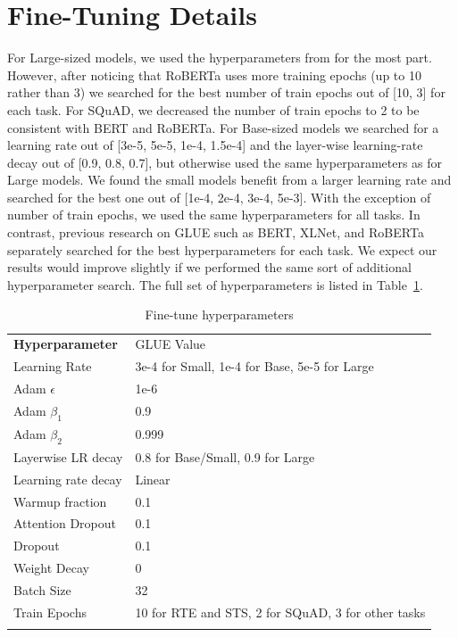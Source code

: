 \documentclass{article}
\newcommand\tstrut{\rule{0pt}{2.6ex}}
\newcommand\bstrut{\rule[-1.0ex]{0pt}{0pt}}
\newcommand{\thinline}{\Xhline{1.5\arrayrulewidth}}
\newcommand{\thickline}{\Xhline{2.5\arrayrulewidth}}
\newcommand{\tsep}	{\bstrut \\ \thinline}
\newcommand{\ttop}{\thickline}
\newcommand{\tbottom}{\bstrut \\ \thickline}
\begin{document}
\section{Fine-Tuning Details}
\label{app:fine}
For Large-sized models, we used the hyperparameters from \citet{Clark2019BAMBM} for the most part.
However, after noticing that RoBERTa \citep{liu2019roberta} uses more training epochs (up to 10 rather than 3) we searched for the best number of train epochs out of [10, 3] for each task. 
For SQuAD, we decreased the number of train epochs to 2 to be consistent with BERT and RoBERTa.
For Base-sized models we searched for a learning rate out of [3e-5, 5e-5, 1e-4, 1.5e-4] and the layer-wise learning-rate decay out of [0.9, 0.8, 0.7], but otherwise used the same hyperparameters as for Large models. 
We found the small models benefit from a larger learning rate and searched for the best one out of [1e-4, 2e-4, 3e-4, 5e-3].
With the exception of number of train epochs, we used the same hyperparameters for all tasks.
In contrast, previous research on GLUE such as BERT, XLNet, and RoBERTa separately searched for the best hyperparameters for each task. 
We expect our results would improve slightly if we performed the same sort of additional hyperparameter search.
The full set of hyperparameters is listed in Table~\ref{tab:hyperfine}.

\addtolength{\tabcolsep}{0pt}
\begin{table}[t!]
\begin{center}
\begin{tabular}{l l}
\ttop
\textbf{Hyperparameter} & GLUE Value \tstrut \tsep
Learning Rate & 3e-4 for Small, 1e-4 for Base, 5e-5 for Large \tstrut \\
Adam $\epsilon$ & 1e-6  \\
Adam $\beta_1$ & 0.9  \\
Adam $\beta_2$ & 0.999 \\
Layerwise LR decay & 0.8 for Base/Small, 0.9 for Large  \\
Learning rate decay & Linear \\
Warmup fraction & 0.1 \\
Attention Dropout & 0.1  \\
Dropout & 0.1  \\
Weight Decay & 0 \\
Batch Size & 32 \\
Train Epochs & 10 for RTE and STS, 2 for SQuAD, 3 for other tasks 
\tbottom
\end{tabular} 
\end{center}
\caption{Fine-tune hyperparameters}
\label{tab:hyperfine}
\end{table}
\addtolength{\tabcolsep}{0pt}
\end{document}
